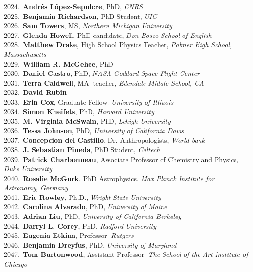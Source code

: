 2024.~{\bf Andr\'{e}s L\'{o}pez-Sepulcre}, PhD, {\sl CNRS} \\
2025.~{\bf Benjamin Richardson}, PhD Student, {\sl UIC} \\
2026.~{\bf Sam Towers}, MS, {\sl Northern Michigan University } \\
2027.~{\bf Glenda Howell}, PhD candidate, {\sl Don Bosco School of English} \\
2028.~{\bf Matthew Drake}, High School Physics Teacher, {\sl Palmer High School, Massachusetts} \\
2029.~{\bf William R. McGehee}, PhD \\
2030.~{\bf Daniel Castro}, PhD, {\sl NASA Goddard Space Flight Center} \\
2031.~{\bf Terra Caldwell}, MA, teacher, {\sl Edendale Middle School, CA} \\
2032.~{\bf David Rubin} \\
2033.~{\bf Erin Cox}, Graduate Fellow, {\sl University of Illinois} \\
2034.~{\bf Simon Kheifets}, PhD, {\sl Harvard University} \\
2035.~{\bf M. Virginia McSwain}, PhD, {\sl Lehigh University} \\
2036.~{\bf Tessa Johnson}, PhD, {\sl University of California Davis} \\
2037.~{\bf Concepcion del Castillo}, Dr. Anthropologists, {\sl World bank} \\
2038.~{\bf J. Sebastian Pineda}, PhD Student, {\sl Caltech} \\
2039.~{\bf Patrick Charbonneau}, Associate Professor of Chemistry and Physics, {\sl Duke University} \\
2040.~{\bf Rosalie McGurk}, PhD Astrophysics, {\sl Max Planck Institute for Astronomy, Germany} \\
2041.~{\bf Eric Rowley}, Ph.D., {\sl Wright State University} \\
2042.~{\bf Carolina Alvarado}, PhD, {\sl University of Maine} \\
2043.~{\bf Adrian Liu}, PhD, {\sl University of California Berkeley} \\
2044.~{\bf Darryl L. Corey}, PhD, {\sl Radford University } \\
2045.~{\bf Eugenia Etkina}, Professor, {\sl Rutgers} \\
2046.~{\bf Benjamin Dreyfus}, PhD, {\sl University of Maryland} \\
2047.~{\bf Tom Burtonwood}, Assistant Professor, {\sl The School of the Art Institute of Chicago} \\
